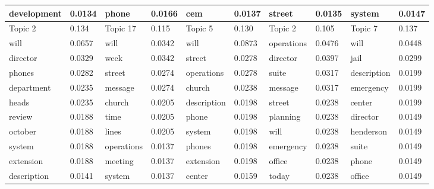 \documentclass[a4paper]{article}
\begin{document}
\begin{table}[ht]
\begin{tabular}{|l|l||l|l||l|l||l|l||l|l|}
\scriptsize development&\scriptsize 0.0134&\scriptsize phone&\scriptsize  0.0166&\scriptsize cem&\scriptsize 0.0137&\scriptsize street&\scriptsize 0.0135&\scriptsize system&\scriptsize 0.0147\\
	\hline\hline
	Topic 2&0.134&Topic 17&0.115&Topic 5 &0.130& Topic 2 & 0.105 & Topic 7 & 0.137 \\
	\hline
	\scriptsize will&\scriptsize 0.0657&\scriptsize will&\scriptsize 0.0342&\scriptsize will&\scriptsize 0.0873&\scriptsize operations&\scriptsize 0.0476&\scriptsize will&\scriptsize 0.0448\\
	\scriptsize director&\scriptsize0.0329&\scriptsize week&\scriptsize 0.0342&\scriptsize street&\scriptsize 0.0278&\scriptsize director&\scriptsize 0.0397&\scriptsize jail &\scriptsize  0.0299\\
	\scriptsize phones&\scriptsize 0.0282&\scriptsize street&\scriptsize 0.0274&\scriptsize operations&\scriptsize 0.0278&\scriptsize suite&\scriptsize 0.0317&\scriptsize description&\scriptsize 0.0199\\
	\scriptsize department&\scriptsize 0.0235&\scriptsize message&\scriptsize  0.0274&\scriptsize church&\scriptsize 0.0238&\scriptsize message&\scriptsize 0.0317&\scriptsize emergency&\scriptsize 0.0199\\
	\scriptsize heads&\scriptsize 0.0235&\scriptsize church&\scriptsize 0.0205&\scriptsize description&\scriptsize 0.0198&\scriptsize street&\scriptsize 0.0238&\scriptsize center&\scriptsize  0.0199\\
	\scriptsize review&\scriptsize 0.0188&\scriptsize time&\scriptsize 0.0205&\scriptsize phone&\scriptsize 0.0198&\scriptsize planning&\scriptsize 0.0238&\scriptsize director&\scriptsize 0.0149\\
	\scriptsize october&\scriptsize 0.0188&\scriptsize lines&\scriptsize 0.0205&\scriptsize system&\scriptsize0.0198&\scriptsize  will&\scriptsize 0.0238&\scriptsize henderson&\scriptsize 0.0149\\
	\scriptsize system&\scriptsize 0.0188&\scriptsize operations&\scriptsize 0.0137&\scriptsize phones&\scriptsize0.0198&\scriptsize emergency&\scriptsize 0.0238&\scriptsize suite&\scriptsize 0.0149\\
	\scriptsize extension&\scriptsize 0.0188&\scriptsize meeting&\scriptsize 0.0137&\scriptsize  extension&\scriptsize0.0198&\scriptsize office&\scriptsize 0.0238&\scriptsize phone&\scriptsize 0.0149\\
	\scriptsize description&\scriptsize 0.0141&\scriptsize system&\scriptsize 0.0137&\scriptsize center&\scriptsize0.0159&\scriptsize today&\scriptsize 0.0238&\scriptsize office&\scriptsize 0.0149\\

\end{tabular}
\end{table}
\end{document}
